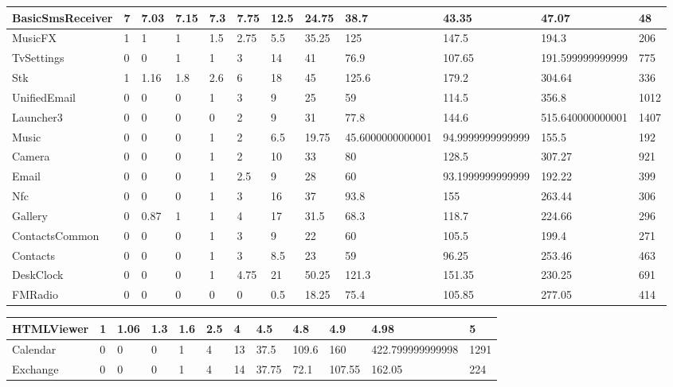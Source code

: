 \documentclass[a4paper]{article}
\begin{document}
\begin{tabular}{|l|l|l|l|l|l|l|l|l|l|l|l|}
\hline
BasicSmsReceiver&7&7.03&7.15&7.3&7.75&12.5&24.75&38.7&43.35&47.07&48\\
\hline
MusicFX&1&1&1&1.5&2.75&5.5&35.25&125&147.5&194.3&206\\
\hline
TvSettings&0&0&1&1&3&14&41&76.9&107.65&191.599999999999&775\\
\hline
Stk&1&1.16&1.8&2.6&6&18&45&125.6&179.2&304.64&336\\
\hline
UnifiedEmail&0&0&0&1&3&9&25&59&114.5&356.8&1012\\
\hline
Launcher3&0&0&0&0&2&9&31&77.8&144.6&515.640000000001&1407\\
\hline
Music&0&0&0&1&2&6.5&19.75&45.6000000000001&94.9999999999999&155.5&192\\
\hline
Camera&0&0&0&1&2&10&33&80&128.5&307.27&921\\
\hline
Email&0&0&0&1&2.5&9&28&60&93.1999999999999&192.22&399\\
\hline
Nfc&0&0&0&1&3&16&37&93.8&155&263.44&306\\
\hline
Gallery&0&0.87&1&1&4&17&31.5&68.3&118.7&224.66&296\\
\hline
ContactsCommon&0&0&0&1&3&9&22&60&105.5&199.4&271\\
\hline
Contacts&0&0&0&1&3&8.5&23&59&96.25&253.46&463\\
\hline
DeskClock&0&0&0&1&4.75&21&50.25&121.3&151.35&230.25&691\\
\hline
FMRadio&0&0&0&0&0&0.5&18.25&75.4&105.85&277.05&414\\
\hline
\end{tabular}
\newline
\begin{tabular}{|l|l|l|l|l|l|l|l|l|l|l|l|}
\hline
HTMLViewer&1&1.06&1.3&1.6&2.5&4&4.5&4.8&4.9&4.98&5\\
\hline
Calendar&0&0&0&1&4&13&37.5&109.6&160&422.799999999998&1291\\
\hline
Exchange&0&0&0&1&4&14&37.75&72.1&107.55&162.05&224\\
\hline
\end{tabular}
\end{document}
